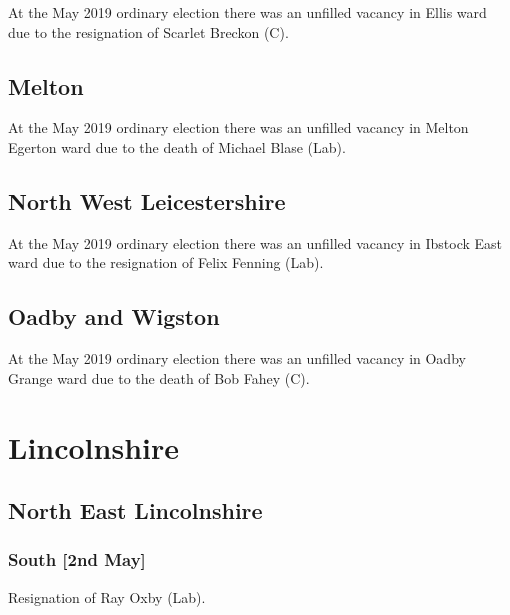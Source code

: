 \documentclass[a4paper,openany]{book}
\begin{document}
\begin{resultsiii}
At the May 2019 ordinary election there was an unfilled vacancy in Ellis ward due to the resignation of Scarlet Breckon (C).

\subsection*{Melton}

At the May 2019 ordinary election there was an unfilled vacancy in Melton Egerton ward due to the death of Michael Blase (Lab).

\subsection*{North West Leicestershire}

At the May 2019 ordinary election there was an unfilled vacancy in Ibstock East ward due to the resignation of Felix Fenning (Lab).

\subsection*{Oadby and Wigston}

At the May 2019 ordinary election there was an unfilled vacancy in Oadby Grange ward due to the death of Bob Fahey (C).

\section{Lincolnshire}

\subsection*{North East Lincolnshire}

\subsubsection*{South \hspace*{\fill}\nolinebreak[1]%
	\enspace\hspace*{\fill}
	[2nd May]}


Resignation of Ray Oxby (Lab).


\end{resultsiii}
\end{document}
